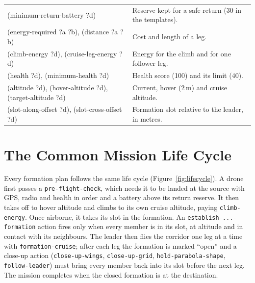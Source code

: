 \documentclass[11pt,a4paper,oneside]{report}
\newcommand{\code}[1]{\texttt{#1}}
\begin{document}
\begin{table}[H]
\begin{tabularx}{\textwidth}{@{}>{\ttfamily\footnotesize}P{0.38\textwidth}Y@{}}
(minimum-return-battery ?d) & Reserve kept for a safe return (30 in the templates). \\
(energy-required ?a ?b), (distance ?a ?b) & Cost and length of a leg. \\
(climb-energy ?d), (cruise-leg-energy ?d) & Energy for the climb and for one follower leg. \\
(health ?d), (minimum-health ?d) & Health score (100) and its limit (40). \\
(altitude ?d), (hover-altitude ?d), (target-altitude ?d) & Current, hover (2\,m) and cruise
altitude. \\
(slot-along-offset ?d), (slot-cross-offset ?d) & Formation slot relative to the leader, in
metres. \\
\bottomrule
\end{tabularx}
\end{table}

\section{The Common Mission Life Cycle}
Every formation plan follows the same life cycle (Figure~\ref{fig:lifecycle}). A drone first
passes a \code{pre-flight-check}, which needs it to be landed at the source with GPS, radio and
health in order and a battery above its return reserve. It then takes off to hover altitude and
climbs to its own cruise altitude, paying \code{climb-energy}. Once airborne, it takes its slot
in the formation. An \code{establish-...-formation} action fires only when every member is in
its slot, at altitude and in contact with its neighbours. The leader then flies the corridor one
leg at a time with \code{formation-cruise}; after each leg the formation is marked ``open'' and
a close-up action (\code{close-up-wings}, \code{close-up-grid}, \code{hold-parabola-shape},
\code{follow-leader}) must bring every member back into its slot before the next leg. The
mission completes when the closed formation is at the destination.
\end{document}
